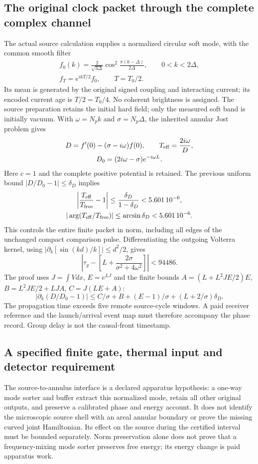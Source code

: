 \documentclass[10pt,twocolumn,letterpaper]{article}
\begin{document}
\subsection{The original clock packet through the complete complex channel}
The actual source calculation supplies a normalized circular soft mode,
with the common smooth filter
\[
 \begin{gathered}
 f_0(k)=\frac{2}{\sqrt{3\Delta}}
       \cos^2\!\frac{\pi(k-\Delta)}{2\Delta},
 \qquad 0<k<2\Delta,\\
 f_T=e^{ikT/2}f_0,\qquad T=T_0/2.
 \end{gathered}
\]
Its mean is generated by the original signed coupling and interacting
current; its encoded current age is $T/2=T_0/4$.  No coherent brightness is
assigned.  The source preparation retains the initial hard field; only the
measured soft band is initially vacuum.  With $\omega=N_pk$ and
$\sigma=N_p\Delta$, the inherited annular Jost problem gives
\[
 \begin{gathered}
 D=f'(0)-(\sigma-i\omega)f(0),\qquad
 T_{\rm eff}=\frac{2i\omega}{D},\\
 D_0=(2i\omega-\sigma)e^{-i\omega L}.
 \end{gathered}
\]
Here $c=1$ and the complete positive potential is retained.  The previous
uniform bound $|D/D_0-1|\leq\delta_D$ implies
\[
 \begin{gathered}
 \left|\frac{T_{\rm eff}}{T_{\rm free}}-1\right|
 \leq\frac{\delta_D}{1-\delta_D}<5.601\,10^{-6},\\
 |\arg(T_{\rm eff}/T_{\rm free})|
 \leq\arcsin\delta_D<5.601\,10^{-6}.
 \end{gathered}
\]
This controls the entire finite packet in norm, including all edges of the
unchanged compact comparison pulse.  Differentiating the outgoing Volterra
kernel, using $|\partial_k[\sin(kd)/k]|\leq d^2/2$, gives
\[
 \left|\tau_g-\left[L+\frac{2\sigma}{\sigma^2+4\omega^2}\right]\right|
 <94486.
\]
The proof uses $J=\int Vdx$, $E=e^{LJ}$ and the finite bounds
$A=(L+L^2JE/2)E$, $B=L^2JE/2+LJA$, $C=J(LE+A)$:
\[
 |\partial_k(D/D_0-1)|
 \leq C/\sigma+B+(E-1)/\sigma+(L+2/\sigma)\delta_D.
\]
The propagation time exceeds five remote source-cycle windows.  A paid
receiver reference and the launch/arrival event map must therefore accompany
the phase record.  Group delay is not the causal-front timestamp.

\subsection{A specified finite gate, thermal input and detector requirement}
The source-to-annulus interface is a declared apparatus hypothesis: a
one-way mode sorter and buffer extract this normalized mode, retain all
other original outputs, and preserve a calibrated phase and energy account.
It does not identify the microscopic source shell with an areal annular
boundary or prove the missing curved joint Hamiltonian.  Its effect on the
source during the certified interval must be bounded separately.  Norm
preservation alone does not prove that a frequency-mixing mode sorter
preserves free energy; its energy change is paid apparatus work.
\end{document}
